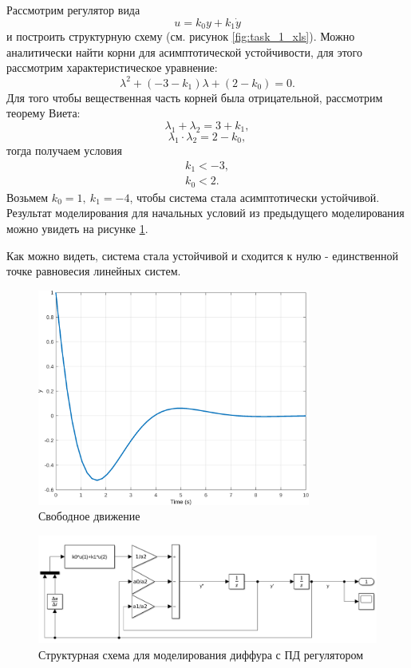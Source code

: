 Рассмотрим регулятор вида
\begin{equation*}
    u=k_0y+k_1\dot y
\end{equation*}
и построить структурную схему (см. рисунок \ref{fig:task_1_xls}). Можно аналитически
найти корни для асимптотической устойчивости, для этого рассмотрим характеристическое уравнение:
\[
    \lambda^2 + (-3 - k_1)\lambda + (2 - k_0) = 0.
\]
Для того чтобы вещественная часть корней была отрицательной, рассмотрим теорему
Виета:
\[
    \lambda_1 + \lambda_2 = 3 +k_1,
\]
\[
    \lambda_1 \cdot \lambda_2 = 2 -k_0,
\]
тогда получаем условия
\begin{equation*}
    \begin{array}{c}
        k_1<-3,\\
        k_0<2.
    \end{array}
\end{equation*}
Возьмем $k_0=1,\ k_1=-4$, чтобы система стала асимптотически устойчивой.
Результат моделирования для начальных условий из предыдущего моделирования можно увидеть
на рисунке \ref{fig:task_1_out_1}.

Как можно видеть, система стала устойчивой и сходится к нулю - единственной точке равновесия
линейных систем.
\begin{figure}[H]
    \centering
    \includegraphics[width=0.8\textwidth]{figs/task_1_out_1.png}
    \caption{Свободное движение}
    \label{fig:task_1_out_1}
\end{figure}
\begin{figure}[H]
    \centering
    \includegraphics[width=1\textwidth]{figs/task_1_slx_1.png}
    \caption{Структурная схема для моделирования диффура с ПД регулятором}
    \label{fig:task_1_xls_1}
\end{figure}


